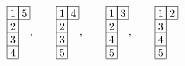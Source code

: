 \[
 \begin{array}[c]{*{2}c}\cline{1-2}
 \lr{1}&\lr{5}\\\cline{1-2}
 \lr{2}\\\cline{1-1}
 \lr{3}\\\cline{1-1}
 \lr{4}\\\cline{1-1}
 \end{array},\hspace{20pt}
 \begin{array}[c]{*{2}c}\cline{1-2}
 \lr{1}&\lr{4}\\\cline{1-2}
 \lr{2}\\\cline{1-1}
 \lr{3}\\\cline{1-1}
 \lr{5}\\\cline{1-1}
 \end{array},\hspace{20pt}
 \begin{array}[c]{*{2}c}\cline{1-2}
 \lr{1}&\lr{3}\\\cline{1-2}
 \lr{2}\\\cline{1-1}
 \lr{4}\\\cline{1-1}
 \lr{5}\\\cline{1-1}
 \end{array},\hspace{20pt}
 \begin{array}[c]{*{2}c}\cline{1-2}
 \lr{1}&\lr{2}\\\cline{1-2}
 \lr{3}\\\cline{1-1}
 \lr{4}\\\cline{1-1}
 \lr{5}\\\cline{1-1}
 \end{array}
 \]
